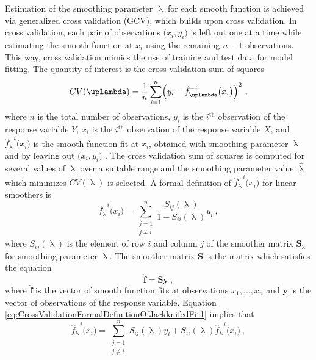Estimation of the smoothing parameter \(\uplambda\) for each smooth function is achieved via generalized cross validation (GCV), which builds upon cross validation.  In cross validation, each pair of observations \(\bigl(x_i, y_i\bigr)\) is left out one at a time while estimating the smooth function at \(x_i\) using the remaining \(n - 1\) observations.  This way, cross validation mimics the use of training and test data for model fitting.  The quantity of interest is the cross validation sum of squares
\begin{equation}
  \label{eq:CrossValidationSumOfSquares01}
  CV(\uplambda) = \frac{1}{n} \sum_{i = 1}^n\Bigl(y_i - \hat{f}_\uplambda^{-i}\bigl(x_i\bigr)\Bigr)^2~,
\end{equation}
where \(n\) is the total number of observations, \(y_i\) is the \(i^{\text{th}}\) observation of the response variable \(Y\), \(x_i\) is the \(i^{\text{th}}\) observation of the response variable \(X\), and \(\hat{f}_\uplambda^{-i}\bigl(x_i\bigr)\) is the smooth function fit at \(x_i\), obtained with smoothing parameter \(\uplambda\) and by leaving out \(\bigl(x_i, y_i\bigr)\) \parencite{Hastie1991}.  The cross validation sum of squares is computed for several values of \(\uplambda\) over a suitable range and the smoothing parameter value \(\hat{\uplambda}\) which minimizes \(CV(\uplambda)\) is selected.  A formal definition of \(\hat{f}_\uplambda^{-i}\bigl(x_i\bigr)\) for linear smoothers is
\begin{equation}
  \label{eq:CrossValidationFormalDefinitionOfJackknifedFit1}
  \hat{f}_\uplambda^{-i}\bigl(x_i\bigr) = \sum_{\substack{j = 1 \\ j \not = i}}^n \frac{S_{i j}(\uplambda)}{1 - S_{i i}(\uplambda)} y_i~,
\end{equation}
where \(S_{i j}(\uplambda)\) is the element of row \(i\) and column \(j\) of the smoother matrix \(\symbf{S}_\uplambda\) for smoothing parameter \(\uplambda\).  The smoother matrix \(\symbf{S}\) is the matrix which satisfies the equation
\begin{equation}
  \label{eq:SmootherMatrixDefinition}
  \hat{\symbf{f}} = \symbf{S} \symbf{y}~,
\end{equation}
where \(\hat{\symbf{f}}\) is the vector of smooth function fits at observations \(x_1, \ldots, x_n\) and \(\symbf{y}\) is the vector of observations of the response variable.
Equation \ref{eq:CrossValidationFormalDefinitionOfJackknifedFit1} implies that
\begin{equation}
  \label{eq:CrossValidationFormalDefinitionOfJackknifedFit2}
  \hat{f}_\uplambda^{-i}\bigl(x_i\bigr) = \sum_{\substack{j = 1 \\ j \not = i}}^n S_{i j}(\uplambda) y_i +S_{i i}(\uplambda) \hat{f}_\uplambda^{-i}\bigl(x_i\bigr)~,
\end{equation}
